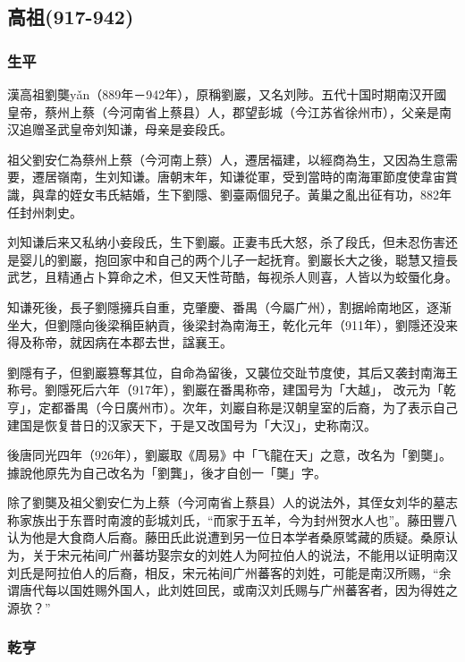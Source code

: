 
\subsection{高祖\tiny(917-942)}

\subsubsection{生平}

漢高祖劉龑yǎn（889年－942年），原稱劉巖，又名刘陟。五代十国时期南汉开國皇帝，蔡州上蔡（今河南省上蔡县）人，郡望彭城（今江苏省徐州市），父亲是南汉追赠圣武皇帝刘知谦，母亲是妾段氏。

祖父劉安仁為蔡州上蔡（今河南上蔡）人，遷居福建，以經商為生，又因為生意需要，遷居嶺南，生刘知谦。唐朝末年，知谦從軍，受到當時的南海軍節度使韋宙賞識，與韋的姪女韦氏結婚，生下劉隱、劉臺兩個兒子。黃巢之亂出征有功，882年任封州刺史。

刘知谦后来又私纳小妾段氏，生下劉巖。正妻韦氏大怒，杀了段氏，但未忍伤害还是婴儿的劉巖，抱回家中和自己的两个儿子一起抚育。劉巖长大之後，聪慧又擅長武艺，且精通占卜算命之术，但又天性苛酷，每视杀人则喜，人皆以为蛟蜃化身。

知谦死後，長子劉隱擁兵自重，克肇慶、番禺（今屬广州），割据岭南地区，逐渐坐大，但劉隱向後梁稱臣納貢，後梁封為南海王，乾化元年（911年），劉隱还没来得及称帝，就因病在本郡去世，諡襄王。

劉隱有子，但劉巖篡奪其位，自命為留後，又襲位交趾节度使，其后又袭封南海王称号。劉隱死后六年（917年），劉巖在番禺称帝，建国号为「大越」， 改元为「乾亨」，定都番禺（今日廣州市）。次年，刘巖自称是汉朝皇室的后裔，为了表示自己建国是恢复昔日的汉家天下，于是又改国号为「大汉」，史称南汉。

後唐同光四年（926年），劉巖取《周易》中「飞龍在天」之意，改名为「劉龑」。據說他原先为自己改名为「劉龔」，後才自创一「龑」字。

除了劉龑及祖父劉安仁为上蔡（今河南省上蔡县）人的说法外，其侄女刘华的墓志称家族出于东晋时南渡的彭城刘氏，“而家于五羊，今为封州贺水人也”。藤田豐八认为他是大食商人后裔。藤田氏此说遭到另一位日本学者桑原骘藏的质疑。桑原认为，关于宋元祐间广州蕃坊娶宗女的刘姓人为阿拉伯人的说法，不能用以证明南汉刘氏是阿拉伯人的后裔，相反，宋元祐间广州蕃客的刘姓，可能是南汉所赐，“余谓唐代每以国姓赐外国人，此刘姓回民，或南汉刘氏赐与广州蕃客者，因为得姓之源欤？”

\subsubsection{乾亨}

